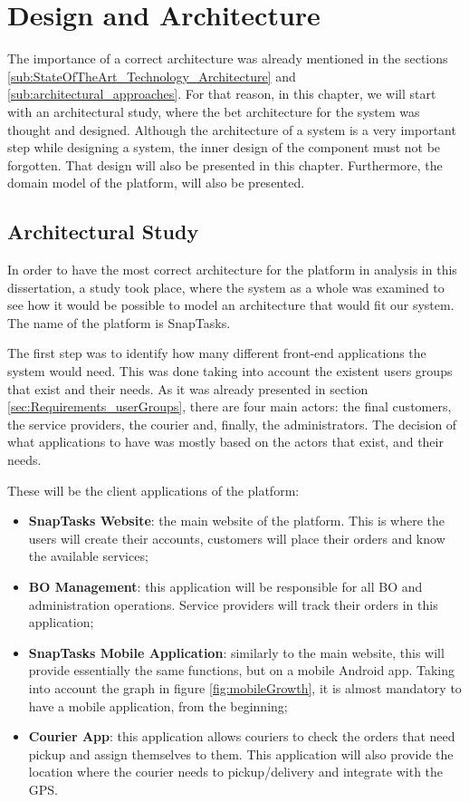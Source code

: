 
\chapter{Design and Architecture} %
\label{chap:Chapter5} 
The importance of a correct architecture was already mentioned in the sections \ref{sub:StateOfTheArt_Technology_Architecture} and \ref{sub:architectural_approaches}. For that reason, in this chapter, we will start with an architectural study, where the bet architecture for the system was thought and designed. Although the architecture of a system is a very important step while designing a system, the inner design of the component must not be forgotten. That design will also be presented in this chapter. Furthermore, the domain model of the platform, will also be presented.

\section{Architectural Study}
\label{sub:architectural-study} 
In order to have the most correct architecture for the platform in analysis in this dissertation, a study took place, where the system as a whole was examined to see how it would be possible to model an architecture that would fit our system. The name of the platform is SnapTasks.
\par
The first step was to identify how many different front-end applications the system would need. This was done taking into account the existent users groups that exist and their needs. As it was already presented in section \ref{sec:Requirements_userGroups}, there are four main actors: the final customers, the service providers, the courier and, finally, the administrators. The decision of what applications to have was mostly based on the actors that exist, and their needs.
\par

These will be the client applications of the platform: 
\begin{itemize}
  \item \textbf{SnapTasks Website}: the main website of the platform. This is where the users will create their accounts, customers will place their orders and know the available services;
  \item \textbf{\gls{BO} Management}: this application will be responsible for all \gls{BO} and administration operations. Service providers will track their orders in this application;
  \item \textbf{SnapTasks Mobile Application}: similarly to the main website, this will provide essentially the same functions, but on a mobile Android app. Taking into account the graph in figure \ref{fig:mobileGrowth}, it is almost mandatory to have a mobile application, from the beginning;
  \item \textbf{Courier App}: this application allows couriers to check the orders that need pickup and assign themselves to them. This application will also provide the location where the courier needs to pickup/delivery and integrate with the \gls{GPS}.
\end{itemize}


